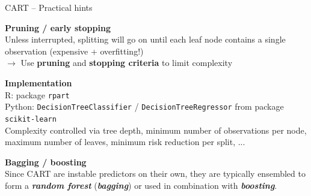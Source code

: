 \documentclass[11pt,compress,t,notes=noshow, xcolor=table]{beamer}
\newcommand{\highlight}[1]{\textcolor{highlightcol}{\textbf{#1}}}
\newcommand{\bfit}[1]{\textbf{\textit{#1}}}
\let\code=\texttt
\begin{document}
\begin{frame}{CART -- Practical hints}

\footnotesize

\highlight{Pruning / early stopping} \\
\smallskip
Unless interrupted, splitting will go on until each leaf node contains a single 
observation (expensive + overfitting!) \\
\smallskip
$\rightarrow$ Use \textbf{pruning} and \textbf{stopping criteria} to limit 
complexity

\lz
\highlight{Implementation} \\
\smallskip
R: package \code{rpart}\\
Python: \code{DecisionTreeClassifier} / \code{DecisionTreeRegressor} from 
package \code{scikit-learn} \\
Complexity controlled via tree depth, minimum number of observations per 
node, maximum number of leaves, minimum risk reduction per split, ...

\lz
\highlight{Bagging / boosting} \\
\smallskip
Since CART are instable predictors on their own, they are typically ensembled
to form a \bfit{random forest} (\bfit{bagging}) or used in combination with 
\bfit{boosting}.

\end{frame}

\end{document}
